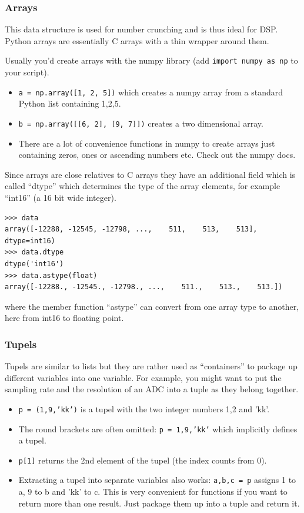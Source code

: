 \documentclass[12pt,a4paper]{article}
\begin{document}
\subsubsection{Arrays}
This data structure is used for number crunching and is thus ideal for
DSP. Python arrays are essentially C arrays with a thin wrapper around
them.

Usually you'd create arrays with the numpy library (add \texttt{import numpy
  as np} to your script).
\begin{itemize}
\item\texttt{a = np.array([1, 2, 5])} which creates a numpy
  array from a standard Python list containing 1,2,5.
\item\texttt{b = np.array([[6, 2], [9, 7]])} creates a two dimensional
  array.
\item There are a lot of convenience functions in numpy to create
  arrays just containing zeros, ones or ascending numbers etc. Check out
   the numpy docs.
\end{itemize}

Since arrays are close relatives to C arrays they have an additional
field which is called ``dtype'' which determines the type of the
array elements, for example ``int16'' (a 16 bit wide integer).
\begin{verbatim}
>>> data
array([-12288, -12545, -12798, ...,    511,    513,    513], dtype=int16)
>>> data.dtype
dtype('int16')
>>> data.astype(float)
array([-12288., -12545., -12798., ...,    511.,    513.,    513.])
\end{verbatim}
where the member function ``astype'' can convert from one array type to another, here
from int16 to floating point.

\subsubsection{Tupels}
Tupels are similar to lists but they are rather used as
``containers'' to package up different variables into one variable. For
example, you might want to put the sampling rate and the resolution of
an ADC into a tuple as they belong together.
\begin{itemize}
\item \texttt{p~=~(1,9,'kk')} is a tupel with the two integer numbers 1,2 and 'kk'.
\item The round brackets are often omitted:
  \texttt{p~=~1,9,'kk'} which implicitly defines a tupel.
\item \texttt{p[1]} returns the 2nd element of the tupel (the index
  counts from 0).
\item Extracting a tupel into separate variables also works:
  \texttt{a,b,c = p} assigns 1 to a, 9 to b and 'kk' to c. This
  is very convenient for functions if you want to return more than
  one result. Just package them up into a tuple and return it.
\end{itemize}
\end{document}

